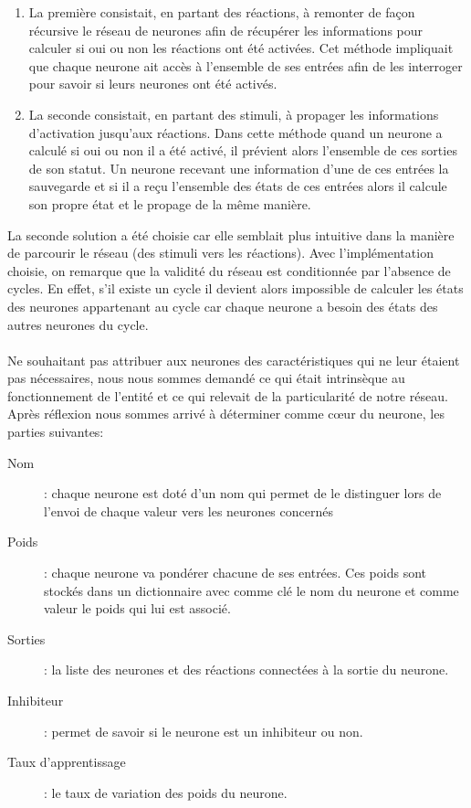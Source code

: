 \begin{enumerate}
  \item La première consistait, en partant des réactions, à remonter de façon
    récursive le réseau de neurones afin de récupérer les informations pour
    calculer si oui ou non les réactions ont été activées. Cet méthode impliquait
    que chaque neurone ait accès à l'ensemble de ses entrées afin de les
    interroger pour savoir si leurs neurones ont été activés.
  \item La seconde consistait, en partant des stimuli, à propager les informations
    d'activation jusqu'aux réactions. Dans cette méthode quand un neurone a calculé
    si oui ou non il a été activé, il prévient alors l'ensemble de ces sorties de
    son statut. Un neurone recevant une information d'une de ces entrées la
    sauvegarde et si il a reçu l'ensemble des états de ces entrées alors il
    calcule son propre état et le propage de la même manière.
\end{enumerate}

La seconde solution a été choisie car elle semblait plus intuitive dans la
manière de parcourir le réseau (des stimuli vers les réactions). Avec
l'implémentation choisie, on remarque que la validité du réseau est
conditionnée par l'absence de cycles. En effet, s'il existe un cycle il
devient alors impossible de calculer les états des neurones appartenant au
cycle car chaque neurone a besoin des états des autres neurones du cycle.

\paragraph{}
Ne souhaitant pas attribuer aux neurones des caractéristiques qui ne leur étaient
pas nécessaires, nous nous sommes demandé ce qui était intrinsèque au
fonctionnement de l'entité et ce qui relevait de la particularité de notre
réseau. Après réflexion nous sommes arrivé à déterminer comme cœur du neurone, les
parties suivantes:\\

\begin{description}
  \item[Nom]: chaque neurone est doté d'un nom qui permet de le distinguer
    lors de l'envoi de chaque valeur vers les neurones concernés
  \item[Poids]: chaque neurone va pondérer chacune de ses entrées. Ces poids
    sont stockés dans un dictionnaire avec comme clé le nom du neurone et
    comme valeur le poids qui lui est associé.
  \item[Sorties]: la liste des neurones et des réactions connectées à la
    sortie du neurone.
  \item[Inhibiteur]: permet de savoir si le neurone est un inhibiteur ou non.
  \item[Taux d'apprentissage]: le taux de variation des poids du neurone.
\end{description}

\paragraph{}


